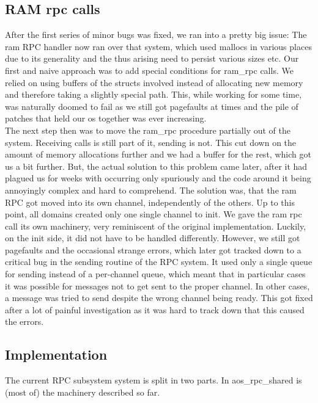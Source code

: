\subsection{RAM rpc calls}
After the first series of minor bugs 
was fixed, we ran into a pretty big issue: The ram RPC handler now ran over 
that system, which used mallocs in various places due to its generality and 
the thus arising need to persist various sizes etc.
Our first and naive approach was to add special 
conditions for ram\_rpc calls. We relied on using buffers of the 
structs involved instead of allocating new memory and therefore taking a slightly special path. 
This, while working for some time, was naturally doomed to fail as we still got 
pagefaults at times and the pile of patches that held our os together was 
ever increasing.\\
\medskip
The next step then was to move the ram\_rpc procedure partially out of the system. 
Receiving calls is still part of it, sending is not. This cut down on the amount of memory allocations 
further and we had a buffer for the rest, which got us a bit 
further. But, the actual solution to this problem came later, after it 
had plagued us for weeks with occurring only spuriously and the code around it 
being annoyingly complex and hard to comprehend.
The solution was, that the ram RPC got moved into its own channel, 
independently of the others. Up to this point, all domains created only one single
channel to init. We gave the ram rpc call its own machinery, very reminiscent of the original 
implementation. Luckily, on the init side, it did not have to be handled 
differently.
However, we still got pagefaults and the occasional strange errors, which 
later got tracked down to a critical bug in the sending routine of the RPC system. It used 
only a single queue for sending instead of a per-channel queue, which meant 
that in particular cases it was possible for messages not to get sent to the 
proper channel. In other cases, a message was tried to send despite the wrong channel being ready. This got fixed after a lot of painful investigation as it 
was hard to track down that this caused the errors.

\subsection{Implementation}
The current RPC subsystem system is split in two parts. In 
aos\_rpc\_shared is (most of) the machinery described so far.
\medskip

